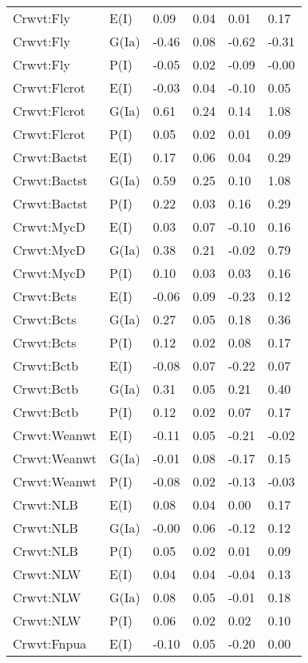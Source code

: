 \begin{center}
\begin{longtable}{|p{1.1in}|p{0.7in}|p{0.7in}|p{0.6in}|p{0.6in}|p{0.6in}|}
  Crwvt:Fly & E(I) & 0.09 & 0.04 & 0.01 & 0.17 \\ 
  Crwvt:Fly & G(Ia) & -0.46 & 0.08 & -0.62 & -0.31 \\ 
  Crwvt:Fly & P(I) & -0.05 & 0.02 & -0.09 & -0.00 \\ 
  Crwvt:Flcrot & E(I) & -0.03 & 0.04 & -0.10 & 0.05 \\ 
  Crwvt:Flcrot & G(Ia) & 0.61 & 0.24 & 0.14 & 1.08 \\ 
  Crwvt:Flcrot & P(I) & 0.05 & 0.02 & 0.01 & 0.09 \\ 
  Crwvt:Bactst & E(I) & 0.17 & 0.06 & 0.04 & 0.29 \\ 
  Crwvt:Bactst & G(Ia) & 0.59 & 0.25 & 0.10 & 1.08 \\ 
  Crwvt:Bactst & P(I) & 0.22 & 0.03 & 0.16 & 0.29 \\ 
  Crwvt:MycD & E(I) & 0.03 & 0.07 & -0.10 & 0.16 \\ 
  Crwvt:MycD & G(Ia) & 0.38 & 0.21 & -0.02 & 0.79 \\ 
  Crwvt:MycD & P(I) & 0.10 & 0.03 & 0.03 & 0.16 \\ 
  Crwvt:Bcts & E(I) & -0.06 & 0.09 & -0.23 & 0.12 \\ 
  Crwvt:Bcts & G(Ia) & 0.27 & 0.05 & 0.18 & 0.36 \\ 
  Crwvt:Bcts & P(I) & 0.12 & 0.02 & 0.08 & 0.17 \\ 
  Crwvt:Bctb & E(I) & -0.08 & 0.07 & -0.22 & 0.07 \\ 
  Crwvt:Bctb & G(Ia) & 0.31 & 0.05 & 0.21 & 0.40 \\ 
  Crwvt:Bctb & P(I) & 0.12 & 0.02 & 0.07 & 0.17 \\ 
  Crwvt:Weanwt & E(I) & -0.11 & 0.05 & -0.21 & -0.02 \\ 
  Crwvt:Weanwt & G(Ia) & -0.01 & 0.08 & -0.17 & 0.15 \\ 
  Crwvt:Weanwt & P(I) & -0.08 & 0.02 & -0.13 & -0.03 \\ 
  Crwvt:NLB & E(I) & 0.08 & 0.04 & 0.00 & 0.17 \\ 
  Crwvt:NLB & G(Ia) & -0.00 & 0.06 & -0.12 & 0.12 \\ 
  Crwvt:NLB & P(I) & 0.05 & 0.02 & 0.01 & 0.09 \\ 
  Crwvt:NLW & E(I) & 0.04 & 0.04 & -0.04 & 0.13 \\ 
  Crwvt:NLW & G(Ia) & 0.08 & 0.05 & -0.01 & 0.18 \\ 
  Crwvt:NLW & P(I) & 0.06 & 0.02 & 0.02 & 0.10 \\ 
  Crwvt:Fnpua & E(I) & -0.10 & 0.05 & -0.20 & 0.00 \\ 

\end{longtable}
\end{center}
